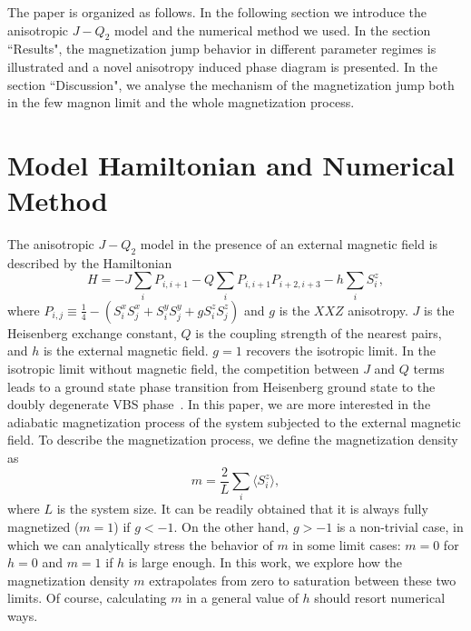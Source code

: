 \documentclass[article,10pt,onecolumn,superscriptaddress,floatfix]{revtex4}
\begin{document}
The paper is organized as follows. In the following section we introduce the anisotropic $J-Q_{2}$ model and the numerical method we used. In the section ``Results", the magnetization jump behavior in different parameter regimes is illustrated and a novel anisotropy induced phase diagram is presented.
In the section ``Discussion", we analyse the mechanism of the magnetization jump both in the few magnon limit and the whole magnetization process.


\section{Model Hamiltonian and Numerical Method}
\label{sec_2}
The anisotropic $J-Q_{2}$ model in the presence of an external magnetic field is described by the Hamiltonian
\begin{equation}\label{ham_jq}
H=-J\sum_{i}P_{i,i+1}-Q\sum_{i}P_{i,i+1}P_{i+2,i+3}-h\sum_{i}S_{i}^{z},
\end{equation}
where $P_{i,j}\equiv\frac{1}{4}-\left(S_{i}^{x}S_{j}^{x}
+S_{i}^{y}S_{j}^{y}+g S_{i}^{z}S_{j}^{z}\right)$ and $g$ is the $XXZ$ anisotropy. $J$ is the Heisenberg exchange constant, $Q$ is the coupling strength of the nearest pairs, and $h$ is the external magnetic field. $g =1$ recovers the isotropic limit.
In the isotropic limit without magnetic field, the competition between $J$ and $Q$ terms leads to a ground state phase transition from Heisenberg ground state to the doubly degenerate VBS phase~\cite{Tang2011}. In this paper, we are more interested in the adiabatic magnetization process of the system subjected to the external magnetic field.
To describe the magnetization process, we define the magnetization density as
\begin{equation}
m=\frac{2}{L}\sum_{i}\langle S_{i}^{z}\rangle,
\end{equation}
where $L$ is the system size. It can be readily obtained that it is always fully magnetized ($m = 1$) if $g < -1$. On the other hand, $g > -1$ is a non-trivial case, in which we can analytically stress the behavior of $m$ in some limit cases: $m=0$ for $h=0$ and $m=1$ if $h$ is large enough.
In this work, we explore how the magnetization density $m$ extrapolates from zero to saturation between these two limits. Of course, calculating $m$ in a general value of $h$ should resort numerical ways.
\end{document}
